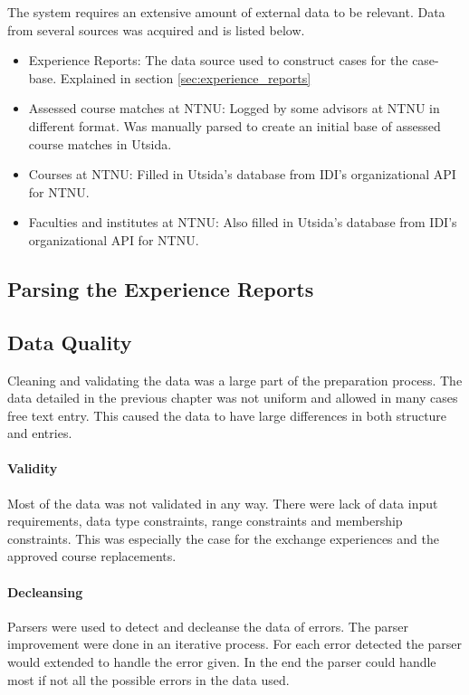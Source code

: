 The system requires an extensive amount of external data to be relevant. Data from several sources was acquired and is listed below.

\begin{itemize}
    \item Experience Reports: The data source used to construct cases for the case-base. Explained in section \ref{sec:experience_reports}
    \item Assessed course matches at NTNU: Logged by some advisors at NTNU in different format. Was manually parsed to create an initial base of assessed course matches in Utsida.
    \item Courses at NTNU: Filled in Utsida's database from IDI's organizational API for NTNU. 
    \item Faculties and institutes at NTNU: Also filled in Utsida's database from IDI's organizational API for NTNU.
\end{itemize}

\subsection{Parsing the Experience Reports}

\subsection{Data Quality}
Cleaning and validating the data was a large part of the preparation process. The data detailed in the previous chapter was not uniform and allowed in many cases free text entry. This caused the data to have large differences in both structure and entries. 

\paragraph{Validity} Most of the data was not validated in any way. There were lack of data input requirements, data type constraints, range constraints and membership constraints. This was especially the case for the exchange experiences and the approved course replacements.


\paragraph{Decleansing} Parsers were used to detect and decleanse the data of errors. The parser improvement were done in an iterative process. For each error detected the parser would extended to handle the error given. In the end the parser could handle most if not all the possible errors in the data used. 

